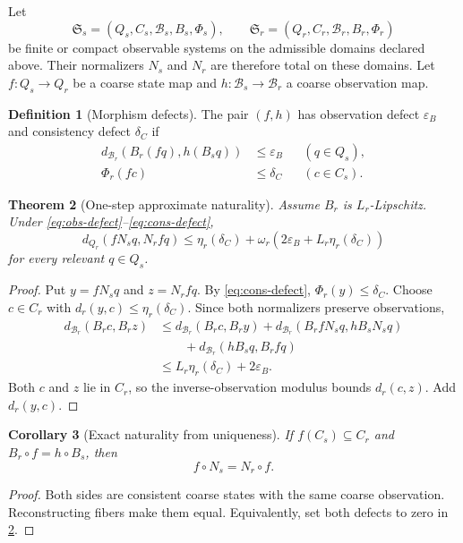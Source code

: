 \documentclass[11pt]{article}
\newtheorem{theorem}{Theorem}[section]
\newtheorem{corollary}[theorem]{Corollary}
\theoremstyle{definition}
\newtheorem{definition}[theorem]{Definition}
\theoremstyle{remark}
\numberwithin{equation}{section}
\newcommand{\cB}{\mathcal B}
\newcommand{\eps}{\varepsilon}
\begin{document}
Let
\[
 \mathfrak S_s=(Q_s,C_s,\cB_s,B_s,\Phi_s),
 \qquad
 \mathfrak S_r=(Q_r,C_r,\cB_r,B_r,\Phi_r)
\]
be finite or compact observable systems on the admissible domains declared
above.  Their normalizers $N_s$ and $N_r$ are therefore total on these
domains.  Let $f:Q_s\to Q_r$ be a coarse state map and
$h:\cB_s\to\cB_r$ a coarse observation map.

\begin{definition}[Morphism defects]
The pair $(f,h)$ has observation defect $\eps_B$ and consistency defect $\delta_C$ if
\begin{align}
 d_{\cB_r}(B_r(fq),h(B_s q))&\le\eps_B &&(q\in Q_s),\label{eq:obs-defect}\\
 \Phi_r(fc)&\le\delta_C &&(c\in C_s).\label{eq:cons-defect}
\end{align}
\end{definition}

\begin{theorem}[One-step approximate naturality]\label{thm:one-step-naturality}
Assume $B_r$ is $L_r$-Lipschitz.  Under \eqref{eq:obs-defect}--\eqref{eq:cons-defect},
\begin{equation}\label{eq:one-step-naturality}
 d_{Q_r}(fN_s q,N_rfq)
 \le
 \eta_r(\delta_C)+
 \omega_r\!\left(2\eps_B+L_r\eta_r(\delta_C)\right)
\end{equation}
for every relevant $q\in Q_s$.
\end{theorem}

\begin{proof}
Put $y=fN_s q$ and $z=N_rfq$.  By \eqref{eq:cons-defect}, $\Phi_r(y)\le\delta_C$.  Choose $c\in C_r$ with $d_r(y,c)\le\eta_r(\delta_C)$.  Since both normalizers preserve observations,
\begin{align*}
 d_{\cB_r}(B_rc,B_rz)
 &\le d_{\cB_r}(B_rc,B_ry)
      +d_{\cB_r}(B_rfN_sq,hB_sN_sq)\\
 &\qquad+d_{\cB_r}(hB_sq,B_rfq)\\
 &\le L_r\eta_r(\delta_C)+2\eps_B.
\end{align*}
Both $c$ and $z$ lie in $C_r$, so the inverse-observation modulus bounds $d_r(c,z)$.  Add $d_r(y,c)$.
\end{proof}

\begin{corollary}[Exact naturality from uniqueness]\label{cor:exact-naturality}
If $f(C_s)\subseteq C_r$ and $B_r\circ f=h\circ B_s$, then
\[
 f\circ N_s=N_r\circ f.
\]
\end{corollary}

\begin{proof}
Both sides are consistent coarse states with the same coarse observation.  Reconstructing fibers make them equal.  Equivalently, set both defects to zero in \cref{thm:one-step-naturality}.
\end{proof}
\end{document}
